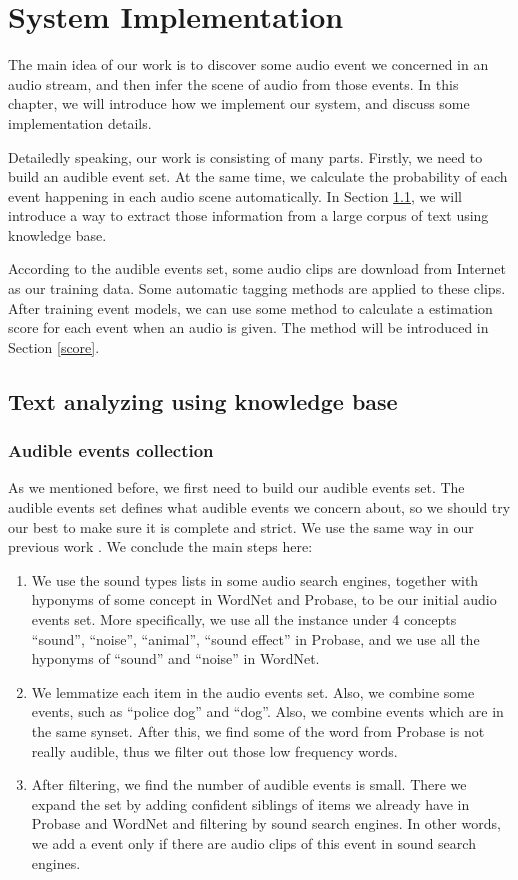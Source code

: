 \chapter{System Implementation}
\label{cha:sys}
The main idea of our work is to discover some audio event we concerned in an audio stream, and then infer the scene of audio from those events. In this chapter, we will introduce how we implement our system, and discuss some implementation details. 

Detailedly speaking, our work is consisting of many parts. Firstly, we need to build an audible event set. At the same time, we calculate the probability of each event happening in each audio scene automatically. In Section \ref{kb}, we will introduce a way to extract those information from a large corpus of text using knowledge base.

According to the audible events set, some audio clips are download from Internet as our training data. Some automatic tagging methods are applied to these clips. After training event models, we can use some method to calculate a estimation score for each event when an audio is given. The method will be introduced in Section \ref{score}.

\section{Text analyzing using knowledge base}
\label{kb}
\subsection{Audible events collection}
As we mentioned before, we first need to build our audible events set. The audible events set defines what audible events we concern about, so we should try our best to make sure it is complete and strict. We use the same way in our previous work \cite{LML}. We conclude the main steps here:
\begin{enumerate}
\item We use the sound types lists in some audio search engines, together with hyponyms of some concept in WordNet and Probase, to be our initial audio events set. More specifically, we use all the instance under 4 concepts ``sound'', ``noise'', ``animal'', ``sound effect'' in Probase, and we use all the hyponyms of ``sound'' and ``noise'' in WordNet.
\item We lemmatize each item in the audio events set. Also, we combine some events, such as ``police dog'' and ``dog''. Also, we combine events which are in the same synset. After this, we find some of the word from Probase is not really audible, thus we filter out those low frequency words.
\item After filtering, we find the number of audible events is small. There we expand the set by adding confident siblings of items we already have in Probase and WordNet and filtering by sound search engines. In other words, we add a event only if there are audio clips of this event in sound search engines.
\end{enumerate}
